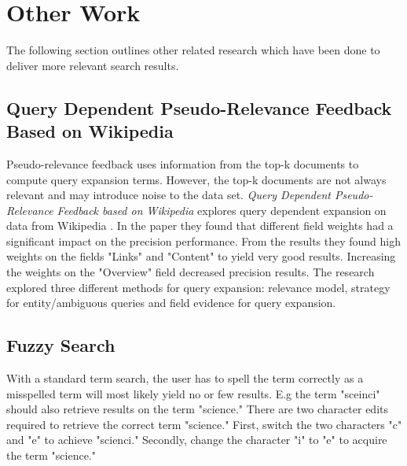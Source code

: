 

\section{Other Work}
The following section outlines other related research which have been done to deliver more relevant search results.

\subsection{Query Dependent Pseudo-Relevance Feedback Based on Wikipedia}
Pseudo-relevance feedback uses information from the top-k documents to compute query expansion terms.
However, the top-k documents are not always relevant and may introduce noise to the data set.
\textit{Query Dependent Pseudo-Relevance Feedback based on Wikipedia} explores query dependent expansion on data from Wikipedia \cite{pseudo-relevance-wikipedia}.
In the paper they found that different field weights had a significant impact on the precision performance.
From the results they found high weights on the fields "Links" and "Content" to yield very good results.
Increasing the weights on the "Overview" field decreased precision results.
The research explored three different methods for query expansion:
relevance model, strategy for entity/ambiguous queries and field evidence for query expansion.

\subsection{Fuzzy Search}
With a standard term search, the user has to spell the term correctly as a misspelled term will most likely yield no or few results.
E.g the term "sceinci" should also retrieve results on the term "science."
There are two character edits required to retrieve the correct term "science."
First, switch the two characters "c" and "e" to achieve "scienci."
Secondly, change the character "i" to "e" to acquire the term "science."

